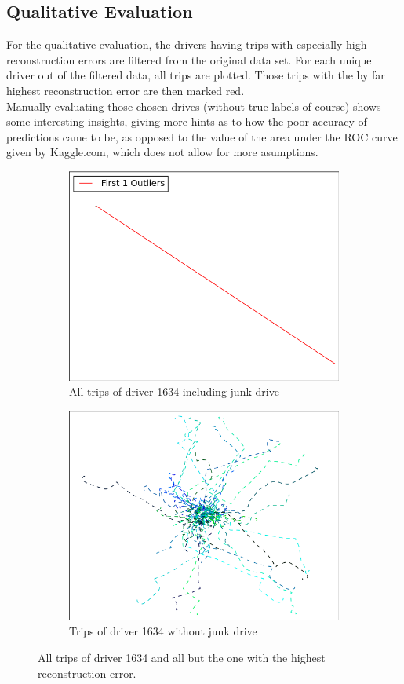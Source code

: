 \documentclass{vldb}
\begin{document}
\subsection{Qualitative Evaluation}

For the qualitative evaluation, the drivers having trips with especially high reconstruction errors are filtered from the original data set. For each unique driver out of the filtered data, all trips are plotted. Those trips with the by far highest reconstruction error are then marked red. \\
Manually evaluating those chosen drives (without true labels of course) shows some interesting insights, giving more hints as to how the poor accuracy of predictions came to be, as opposed to the value of the area under the ROC curve given by Kaggle.com, which does not allow for more asumptions.
\begin{figure}
\begin{subfigure}{\linewidth}
	\centering
	\includegraphics[width=.8\linewidth]{"pics/outliers_junk/D_1634_with_136"}
	\caption{All trips of driver 1634 including junk drive}
	\label{fig:d-1634-junk}
\end{subfigure}
\begin{subfigure}{\linewidth}
  \centering
  \includegraphics[width=0.8\linewidth]{"pics/outliers_junk/D_1634_wo_136"}
\caption{Trips of driver 1634 without junk drive}
\label{fig:d-1634}
\end{subfigure}
\caption{All trips of driver 1634 and all but the one with the highest reconstruction error.}
\label{fig:1634}
\end{figure}
\end{document}
